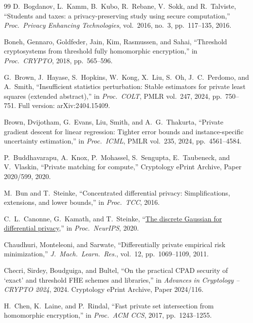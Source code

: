 \documentclass[11pt]{article}
\theoremstyle{definition}
\theoremstyle{plain}
\begin{document}
\begin{thebibliography}{99}
D.~Bogdanov, L.~Kamm, B.~Kubo, R.~Rebane, V.~Sokk, and R.~Talviste,
``Students and taxes: a privacy-preserving study using secure computation,''
\textit{Proc.\ Privacy Enhancing Technologies}, vol.~2016, no.~3, pp.\ 117--135, 2016.

Boneh, Gennaro, Goldfeder, Jain, Kim, Rasmussen, and Sahai,
``Threshold cryptosystems from threshold fully homomorphic encryption,''
in \textit{Proc.\ CRYPTO}, 2018, pp.\ 565--596.

G.~Brown, J.~Hayase, S.~Hopkins, W.~Kong, X.~Liu, S.~Oh, J.~C.~Perdomo, and A.~Smith,
``Insufficient statistics perturbation: Stable estimators for private least squares (extended abstract),''
in \textit{Proc.\ COLT}, PMLR vol.~247, 2024, pp.\ 750--751. Full version: arXiv:2404.15409.

Brown, Dvijotham, G.~Evans, Liu, Smith, and A.~G.~Thakurta,
``Private gradient descent for linear regression: Tighter error bounds and instance-specific uncertainty estimation,''
in \textit{Proc.\ ICML}, PMLR vol.~235, 2024, pp.\ 4561--4584.

P.~Buddhavarapu, A.~Knox, P.~Mohassel, S.~Sengupta, E.~Taubeneck, and V.~Vlaskin,
``Private matching for compute,''
Cryptology ePrint Archive, Paper 2020/599, 2020.

M.~Bun and T.~Steinke,
``Concentrated differential privacy: Simplifications, extensions, and lower bounds,''
in \textit{Proc.\ TCC}, 2016.

C.~L.~Canonne, G.~Kamath, and T.~Steinke,
``\href{https://proceedings.neurips.cc/paper/2020/hash/b53b3a3d6ab90ce0268229151c9bde11-Abstract.html}{The discrete Gaussian for differential privacy},''
in \textit{Proc.\ NeurIPS}, 2020.

Chaudhuri, Monteleoni, and Sarwate,
``Differentially private empirical risk minimization,''
\textit{J.\ Mach.\ Learn.\ Res.}, vol.~12, pp.\ 1069--1109, 2011.

Checri, Sirdey, Boudguiga, and Bultel,
``On the practical CPAD security of `exact' and threshold FHE schemes and libraries,''
in \textit{Advances in Cryptology -- CRYPTO 2024}, 2024. Cryptology ePrint Archive, Paper 2024/116.

H.~Chen, K.~Laine, and P.~Rindal,
``Fast private set intersection from homomorphic encryption,''
in \textit{Proc.\ ACM CCS}, 2017, pp.\ 1243--1255.


\end{thebibliography}
\end{document}
